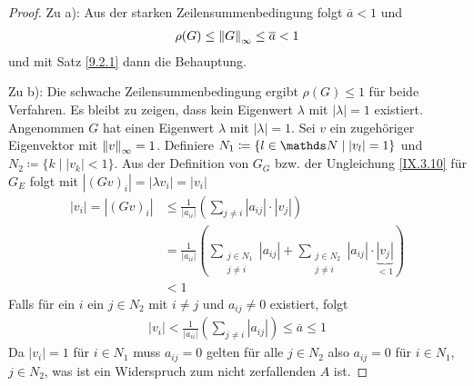 \begin{Satze}[Zeilensummenkriterium]
\begin{proof}
Zu a): Aus der starken Zeilensummenbedingung folgt $\overline{a}<1$
und
\begin{gather*}
  \rho(G)\leq \left\| G \right\|_\infty \leq \overline{a}<1
\end{gather*}
und mit Satz \ref{9.2.1} dann die Behauptung.

Zu b): Die schwache Zeilensummenbedingung ergibt 
$\rho(G) \leq 1$ für beide Verfahren.
Es bleibt zu zeigen, dass kein Eigenwert $\lambda$ mit
$|\lambda|=1$ existiert.
Angenommen $G$ hat einen Eigenwert $\lambda$ mit $|\lambda|=1$.
Sei $v$ ein zugehöriger Eigenvektor mit $\left\| v \right\|_\infty=1$.
Definiere $N_1\coloneqq \{l\in\N \mid |v_l|=1\}$
und $N_2\coloneqq \{k\mid |v_k| <1\}$.
Aus der Definition von $G_G$ bzw. der Ungleichung \eqref{IX.3.10}
für $G_E$ folgt mit $|(Gv)_i| = |\lambda v_i| = |v_i|$
\begin{align*}
  |v_i| = |(Gv)_i| &\leq \frac{1}{|a_{ii}|}\left(
                     \sum_{j\neq i} |a_{ij}|\cdot |{v_j}|
                     \right) \\
                   &=\frac{1}{|a_{ii}|}\left(
                     \sum_{\substack{j\in N_1\\j\neq i}}|a_{ij}|
                     +\sum_{\substack{j\in N_2\\j\neq i}} |a_{ij}|
                     \cdot\underbrace{|{v_j}|}_{<1}
                     \right) \\
                   &<1
\end{align*}
Falls für ein $i$ ein $j\in N_2$ mit $i\neq j$ und $a_{ij}\neq 0$
existiert, folgt
\begin{gather*}
  |v_i| < \frac{1}{|a_{ii}|} \left( \sum_{j\neq i}|a_{ij}|\right)
  \leq \overline{a} \leq 1
\end{gather*}
Da $|v_i|=1$ für $i\in N_1$ muss $a_{ij}=0$ gelten für alle $j\in N_2$
also $a_{ij}=0$ für $i\in N_1$, $j\in N_2$,
was ist ein Widerspruch zum nicht zerfallenden $A$ ist.
\end{proof}
\end{Satze}


